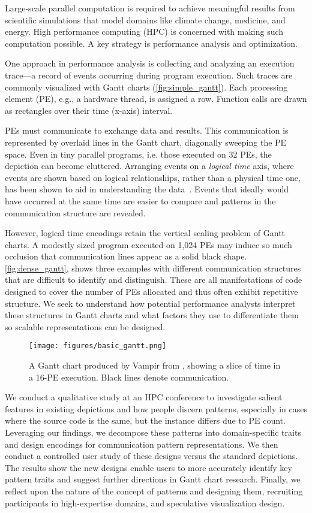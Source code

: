 Large-scale parallel computation is required to achieve meaningful results from scientific simulations that model domains like climate change, medicine, and energy. High performance computing (HPC) is concerned with making such computation possible. A key strategy is performance analysis and optimization. 

One approach in performance analysis is collecting and analyzing an execution trace---a record of events occurring during program execution. Such traces are commonly visualized with Gantt charts (\autoref{fig:simple_gantt}). Each processing element (PE), e.g., a hardware thread, is assigned a row. Function calls are drawn as rectangles over their time (x-axis) interval. 

PEs must communicate to exchange data and results. This communication is represented by overlaid lines in the Gantt chart, diagonally sweeping the PE space. Even in tiny parallel programs, i.e. those executed on 32 PEs, the depiction can become cluttered. Arranging events on a {\em logical time} axis, where events are shown based on logical relationships, rather than a physical time one, has been shown to aid in understanding the data~\cite{isaacs2014combing}. Events that ideally would have occurred at the same time are easier to compare and patterns in the communication structure are revealed.

However, logical time encodings retain the vertical scaling problem of Gantt charts. A modestly sized program executed on 1,024 PEs may induce so much occlusion that communication lines appear as a solid black shape. \autoref{fig:dense_gantt}, shows three examples with different communication structures that are difficult to identify and distinguish. These are all manifestations of code designed to cover the number of PEs allocated and thus often exhibit repetitive structure. We seek to understand how potential performance analysts interpret these structures in Gantt charts and what factors they use to differentiate them so scalable representations can be designed.

\begin{figure}[htb]
    \centering
    \texttt{[image: figures/basic\_gantt.png]}
    \caption{A Gantt chart produced by Vampir from \cite{isaacs2014state}, showing a slice of time in a 16-PE execution. Black lines denote communication.}
    \label{fig:simple_gantt}
\end{figure}

We conduct a qualitative study at an HPC conference to investigate salient features in existing depictions and how people discern patterns, especially in cases where the source code is the same, but the instance differs due to PE count. Leveraging our findings, we decompose these patterns into domain-specific traits and design encodings for communication pattern representations. We then conduct a controlled user study of these designs versus the standard depictions. The results show the new designs enable users to more accurately identify key pattern traits and suggest further directions in Gantt chart research. Finally, we reflect upon the nature of the concept of patterns and designing them, recruiting participants in high-expertise domains, and speculative visualization design. 

